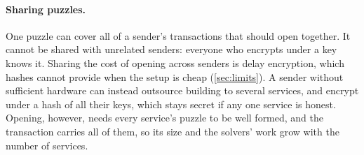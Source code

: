 \paragraph{Sharing puzzles.}\label{sec:sharing}
One puzzle can cover all of a sender's transactions that should open together. It cannot be shared with unrelated senders: everyone who encrypts under a key knows it. Sharing the cost of opening across senders is delay encryption, which hashes cannot provide when the setup is cheap (\cref{sec:limits}). A sender without sufficient hardware can instead outsource building to several services, and encrypt under a hash of all their keys, which stays secret if any one service is honest. Opening, however, needs every service's puzzle to be well formed, and the transaction carries all of them, so its size and the solvers' work grow with the number of services.
